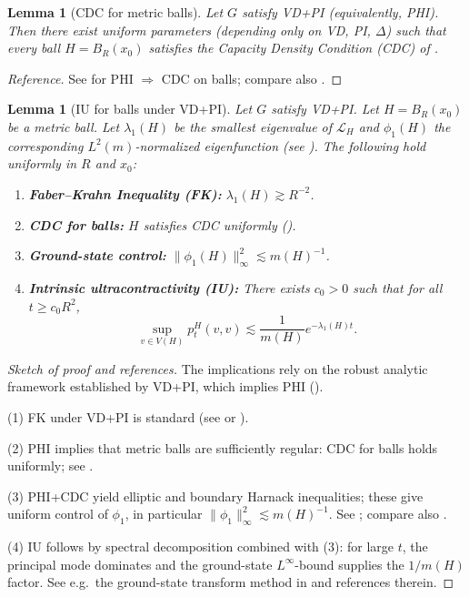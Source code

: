 \documentclass{article}
\numberwithin{equation}{section}
\newtheorem{lemma}[theorem]{Lemma}
\theoremstyle{definition}
\theoremstyle{remark}
\newcommand{\LL}{\mathcal{L}}
\begin{document}
\begin{lemma}[CDC for metric balls]\label{lem:CDC-balls}
Let $G$ satisfy VD+PI (equivalently, PHI). Then there exist uniform parameters (depending only on VD, PI, $\Delta$) such that every ball $H=B_R(x_0)$ satisfies the Capacity Density Condition \textup{(CDC)} of .
\end{lemma}
\begin{proof}[Reference]
See \cite[Prop.~3.5]{BarlowBass04} for PHI $\Rightarrow$ CDC on balls; compare also \cite{BarlowBassKumagai09}.
\end{proof}

\begin{lemma}[IU for balls under VD+PI]\label{lem:IU_derivation}
Let $G$ satisfy VD+PI. Let $H=B_R(x_0)$ be a metric ball. Let $\lambda_1(H)$ be the smallest eigenvalue of $\LL_H$ and $\phi_1(H)$ the corresponding $L^2(m)$-normalized eigenfunction (see ). The following hold uniformly in $R$ and $x_0$:
\begin{enumerate}
    \item \textbf{Faber--Krahn Inequality (FK):} $\lambda_1(H) \gtrsim R^{-2}$.
    \item \textbf{CDC for balls:} $H$ satisfies CDC uniformly \textup{(}\textup{)}.
    \item \textbf{Ground-state control:} $\|\phi_1(H)\|_{\infty}^2 \lesssim m(H)^{-1}$.
    \item \textbf{Intrinsic ultracontractivity (IU):} There exists $c_0>0$ such that for all $t\ge c_0 R^2$,
    \[
    \sup_{v \in V(H)} p_t^H(v,v) \lesssim \frac{1}{m(H)} e^{-\lambda_1(H) t}.
    \]
\end{enumerate}
\end{lemma}
\begin{proof}[Sketch of proof and references]
The implications rely on the robust analytic framework established by VD+PI, which implies PHI ().

(1) FK under VD+PI is standard (see \cite[Ch. 8]{Grigoryan09} or \cite[Prop. 5.1]{BarlowBass04}).

(2) PHI implies that metric balls are sufficiently regular: CDC for balls holds uniformly; see .

(3) PHI+CDC yield elliptic and boundary Harnack inequalities; these give uniform control of $\phi_1$, in particular $\|\phi_1\|_\infty^2\lesssim m(H)^{-1}$. See \cite[Thm.~4.5]{BarlowBassKumagai09}; compare also \cite{BassKumagai08}.

(4) IU follows by spectral decomposition combined with (3): for large $t$, the principal mode dominates and the ground-state $L^\infty$-bound supplies the $1/m(H)$ factor. See e.g.\ the ground-state transform method in \cite{Grigoryan09} and references therein.
\end{proof}
\end{document}
